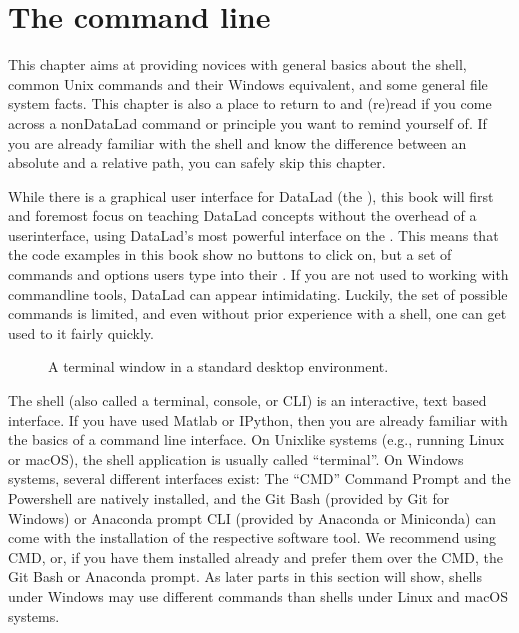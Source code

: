\chapter{The command line}
\label{\detokenize{intro/howto:the-command-line}}\label{\detokenize{intro/howto:howto}}\label{\detokenize{intro/howto:index-0}}\label{\detokenize{intro/howto::doc}}

\sphinxAtStartPar
This chapter aims at providing novices with general basics about the shell, common Unix
commands and their Windows equivalent, and some general file system facts.
This chapter is also a place to return to and (re\sphinxhyphen{})read if you come across a
non\sphinxhyphen{}DataLad command or principle you want to remind yourself of.
If you are already familiar with the shell and know the difference between an absolute
and a relative path, you can safely skip this chapter.

\sphinxAtStartPar
While there is a graphical user interface for DataLad (the {\hyperref[\detokenize{glossary:term-DataLad-Gooey}]{}}), this book will first and foremost focus on teaching DataLad concepts without the overhead of a user\sphinxhyphen{}interface, using DataLad’s most powerful interface on the .
This means that the code examples in this book show no buttons to click on, but a set of commands and options users type into their .
If you are not used to working with command\sphinxhyphen{}line tools, DataLad can appear intimidating.
Luckily, the set of possible commands is limited, and even without prior experience with a shell, one can get used to it fairly quickly.

\begin{figure}[tbp]
\centering
\capstart

\noindent{}
\caption{A terminal window in a standard desktop environment.}\label{\detokenize{intro/howto:id1}}\end{figure}

\sphinxAtStartPar
The shell (also called a terminal, console, or CLI) is an interactive,
text based interface. If you have used Matlab or IPython, then you are already familiar
with the basics of a command line interface.
On Unix\sphinxhyphen{}like systems (e.g., running Linux or macOS), the shell application is usually called “terminal”.
On Windows systems, several different interfaces exist: The “CMD” Command Prompt and the Powershell are natively installed, and the Git Bash (provided by Git for Windows) or Anaconda prompt CLI (provided by Anaconda or Miniconda) can come with the installation of the respective software tool.
We recommend using CMD, or, if you have them installed already and prefer them over the CMD, the Git Bash or Anaconda prompt.
As later parts in this section will show, shells under Windows may use different commands than shells under Linux and macOS systems.


